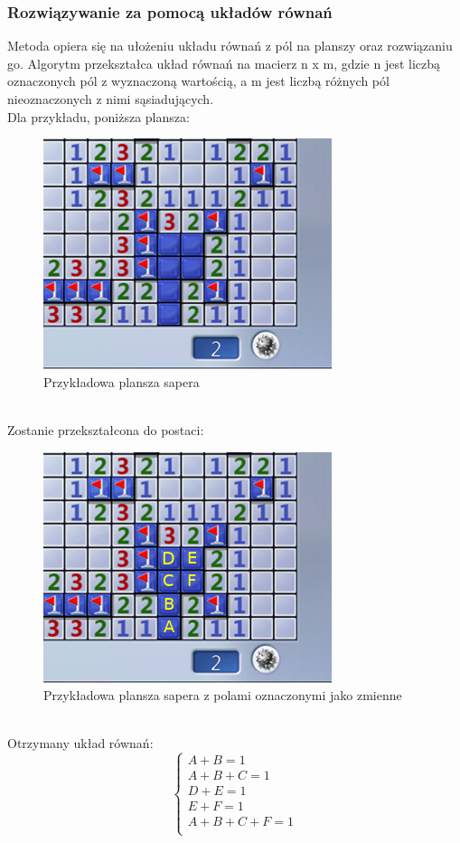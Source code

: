 \documentclass[letterpaper,12pt]{article} %
\begin{document}
\subsubsection*{Rozwiązywanie za pomocą układów równań}
Metoda opiera się na ułożeniu układu równań z pól na planszy oraz rozwiązaniu go. 
Algorytm przekształca układ równań na macierz n x m, gdzie n jest liczbą oznaczonych 
pól z wyznaczoną wartością, a m jest liczbą różnych pól nieoznaczonych z nimi sąsiadujących.\\
Dla przykładu, poniższa plansza:
\begin{figure}[h]
    \centering
    \includegraphics[scale=0.5]{matrix_first.png}
    \caption{Przykładowa plansza sapera}
\end{figure} \\
Zostanie przekształcona do postaci:\\
\begin{figure}[h]
    \centering
    \includegraphics[scale=0.5]{matrix_marked.png}
    \caption{Przykładowa plansza sapera z polami oznaczonymi jako zmienne}
\end{figure} \\
Otrzymany układ równań: \\
$$
\begin{cases}
 A + B = 1 \\
 A + B + C = 1 \\
 D + E = 1 \\
 E + F = 1 \\
 A + B + C + F = 1 \\
\end{cases}
$$
\end{document}
